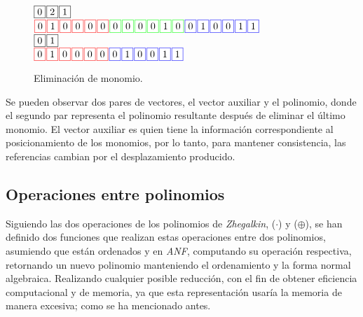 \begin{figure}
    \centering
    \begin{minipage}[c][3.5cm][b]{.65\textwidth}
    \noindent
    $\fbox{0} \hspace*{.1em} \fbox{2} \hspace*{.1em} \fbox{1}$\ \\
    \noindent
    $\fcolorbox{red}{white}{0} \sep \fcolorbox{red}{white}{1} \sep \fcolorbox{red}{white}{0} \sep \fcolorbox{red}{white}{0} \sep \fcolorbox{red}{white}{0} \sep \fcolorbox{red}{white}{0} \sep \fcolorbox{green}{white}{0} \sep \fcolorbox{green}{white}{0} \sep \fcolorbox{green}{white}{0} \sep \fcolorbox{green}{white}{0} \sep \fcolorbox{green}{white}{1} \sep \fcolorbox{green}{white}{0} \sep \fcolorbox{blue}{white}{0} \sep \fcolorbox{blue}{white}{1} \sep \fcolorbox{blue}{white}{0} \sep \fcolorbox{blue}{white}{0} \sep \fcolorbox{blue}{white}{1} \sep \fcolorbox{blue}{white}{1}$\ \\
    \noindent
    $\fbox{0} \hspace*{.1em} \fbox{1}$\ \\
    \noindent
    $\fcolorbox{red}{white}{0} \sep \fcolorbox{red}{white}{1} \sep \fcolorbox{red}{white}{0} \sep \fcolorbox{red}{white}{0} \sep \fcolorbox{red}{white}{0} \sep \fcolorbox{red}{white}{0} \sep \fcolorbox{blue}{white}{0} \sep \fcolorbox{blue}{white}{1} \sep \fcolorbox{blue}{white}{0} \sep \fcolorbox{blue}{white}{0} \sep \fcolorbox{blue}{white}{1} \sep \fcolorbox{blue}{white}{1}$
    \end{minipage}
\caption{Eliminación de monomio.}
\label{fig:p_e}
\end{figure}

Se pueden observar dos pares de vectores, el vector auxiliar y el polinomio, donde el segundo par representa el polinomio resultante después de eliminar el último monomio. El vector auxiliar es quien tiene la información correspondiente al posicionamiento de los monomios, por lo tanto, para mantener consistencia, las referencias cambian por el desplazamiento producido.

\subsection{Operaciones entre polinomios}

Siguiendo las dos operaciones de los polinomios de \textit{Zhegalkin}, ($\cdot$) y ($\oplus$), se han definido dos funciones que realizan estas operaciones entre dos polinomios, asumiendo que están ordenados y en \textit{ANF}, computando su operación respectiva, retornando un nuevo polinomio manteniendo el ordenamiento y la forma normal algebraica. Realizando cualquier posible reducción, con el fin de obtener eficiencia computacional y de memoria, ya que esta representación usaría la memoria de manera excesiva; como se ha mencionado antes.


